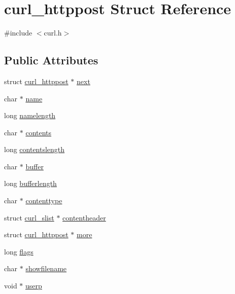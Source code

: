 \hypertarget{structcurl__httppost}{}\section{curl\+\_\+httppost Struct Reference}
\label{structcurl__httppost}


{\ttfamily \#include $<$curl.\+h$>$}

\subsection*{Public Attributes}
\begin{DoxyCompactItemize}
\item 
struct \hyperlink{structcurl__httppost}{curl\+\_\+httppost} $\ast$ \hyperlink{structcurl__httppost_a09be6ec2bb379d4580f5022be3fa65d7}{next}
\item 
char $\ast$ \hyperlink{structcurl__httppost_a220d8914fab9c2b11df43e4489c9ebb3}{name}
\item 
long \hyperlink{structcurl__httppost_aaabe46ae54c1b46510d704f71bcfc041}{namelength}
\item 
char $\ast$ \hyperlink{structcurl__httppost_abe65acc6cb851361062d0db3f7a6c5b5}{contents}
\item 
long \hyperlink{structcurl__httppost_ac24054760afb7cde780d2bfafae95cce}{contentslength}
\item 
char $\ast$ \hyperlink{structcurl__httppost_a10d800f5b6b4486907f3ff6adfa7d99b}{buffer}
\item 
long \hyperlink{structcurl__httppost_a2cc7607526bc628dad57f59d5ea1fa72}{bufferlength}
\item 
char $\ast$ \hyperlink{structcurl__httppost_aec999c1b21ea36a41c1c5091e4ac079b}{contenttype}
\item 
struct \hyperlink{structcurl__slist}{curl\+\_\+slist} $\ast$ \hyperlink{structcurl__httppost_a8f632bdc568ef8116fb07ad64ec1fbc4}{contentheader}
\item 
struct \hyperlink{structcurl__httppost}{curl\+\_\+httppost} $\ast$ \hyperlink{structcurl__httppost_ae172f44466b43441fc1429e1ff198753}{more}
\item 
long \hyperlink{structcurl__httppost_a937965b8a5e172edabdc08768ff0c76a}{flags}
\item 
char $\ast$ \hyperlink{structcurl__httppost_a84945dbb6cf774682227cfaab2ba7e01}{showfilename}
\item 
void $\ast$ \hyperlink{structcurl__httppost_ad2e5d00f8c4c6c536860599701c69694}{userp}
\end{DoxyCompactItemize}


